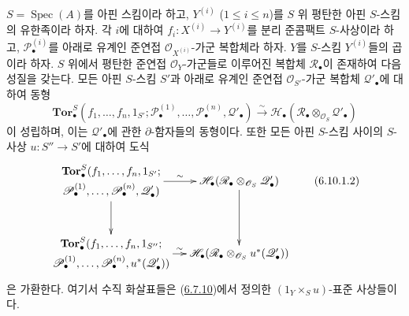 \begin{proposition}[6.10.1]
\label{III.6.10.1-fr}
$S=\operatorname{Spec}(A)$를 아핀 스킴이라 하고,
$Y^{(i)}$ ($1\leq i\leq n$)를 $S$ 위 평탄한 아핀 $S$-스킴의
유한족이라 하자. 각 $i$에 대하여
$f_i:X^{(i)}\to Y^{(i)}$를 분리 준콤팩트 $S$-사상이라 하고,
$\mathscr P_\bullet^{(i)}$를 아래로 유계인 준연접
$\mathscr O_{X^{(i)}}$-가군 복합체라 하자. $Y$를 $S$-스킴
$Y^{(i)}$들의 곱이라 하자. $S$ 위에서 평탄한 준연접
$\mathscr O_Y$-가군들로 이루어진 복합체 $\mathscr R_\bullet$이
존재하여 다음 성질을 갖는다. 모든 아핀 $S$-스킴 $S'$과 아래로
유계인 준연접 $\mathscr O_{S'}$-가군 복합체
$\mathscr Q'_\bullet$에 대하여 동형
\[
  \mathbf{Tor}_\bullet^S
  (f_1,\ldots,f_n,1_{S'};
   \mathscr P_\bullet^{(1)},\ldots,\mathscr P_\bullet^{(n)},
   \mathscr Q'_\bullet)
  \xrightarrow{\sim}
  \mathscr H_\bullet
  (\mathscr R_\bullet\otimes_{\mathscr O_S}\mathscr Q'_\bullet)
  \tag{6.10.1.1}\label{III.6.10.1.1.fr}
\]
이 성립하며, 이는 $\mathscr Q'_\bullet$에 관한 $\partial$-함자들의
동형이다. 또한 모든 아핀 $S$-스킴 사이의 $S$-사상
$u:S''\to S'$에 대하여 도식
\[
\xymatrix@C=12pt@R=30pt{
  {\begin{gathered}
    \mathbf{Tor}_\bullet^S
    (f_1,\ldots,f_n,1_{S'};\\
    \mathscr P_\bullet^{(1)},\ldots,\mathscr P_\bullet^{(n)},
    \mathscr Q'_\bullet)
  \end{gathered}}
  \ar[r]^-{\sim}\ar[d]
  &
  {\mathscr H_\bullet
    (\mathscr R_\bullet\otimes_{\mathscr O_S}\mathscr Q'_\bullet)}
  \ar[d]
  \\
  {\begin{gathered}
    \mathbf{Tor}_\bullet^S
    (f_1,\ldots,f_n,1_{S''};\\
    \mathscr P_\bullet^{(1)},\ldots,\mathscr P_\bullet^{(n)},
    u^*(\mathscr Q'_\bullet))
  \end{gathered}}
  \ar[r]^-{\sim}
  &
  {\mathscr H_\bullet
    (\mathscr R_\bullet\otimes_{\mathscr O_S}u^*(\mathscr Q'_\bullet))}
}
\tag{6.10.1.2}\label{III.6.10.1.2.fr}
\]
은 가환한다. 여기서 수직 화살표들은
(\hyperref[III.6.7.10-fr]{6.7.10})에서 정의한
$(1_Y\times_Su)$-표준 사상들이다.
\end{proposition}

